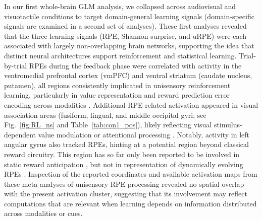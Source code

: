 \documentclass{article}
\begin{document}
In our first whole-brain GLM analysis, we collapsed across audiovisual and visuotactile conditions to target domain-general learning signals (domain-specific signals are examined in a second set of analyses). These first analyses revealed that the three learning signals (RPE, Shannon surprise, and uRPE) were each associated with largely non-overlapping brain networks, supporting the idea that distinct neural architectures support reinforcement and statistical learning. Trial-by-trial RPEs during the feedback phase were correlated with activity in the ventromedial prefrontal cortex (vmPFC) and ventral striatum (caudate nucleus, putamen), all regions consistently implicated in unisensory reinforcement learning, particularly in value representation and reward prediction error encoding across modalities \cite{Schultz1997, glimcher2011understanding, o2004reward, niv2009reinforcement, daw2011trial, o2003temporal}. Additional RPE-related activation appeared in visual association areas (fusiform, lingual, and middle occipital gyri; see Fig.~\ref{fig:RL_ns} and Table~\ref{tab:con1_pos}), likely reflecting visual stimulus-dependent value modulation or attentional processing \cite{chase2015reinforcement, corlett2022meta, garrison2013prediction}. Notably, activity in left angular gyrus also tracked RPEs, hinting at a potential region beyond classical reward circuitry. This region has so far only been reported to be involved in static reward anticipation \cite{wilson2018neural, kahnt2014disentangling}, but not in representation of dynamically evolving RPEs \cite{corlett2022meta, chase2015reinforcement, garrison2013prediction}. Inspection of the reported coordinates and available activation maps from these meta-analyses of unisensory RPE processing revealed no spatial overlap with the present activation cluster, suggesting that its involvement may reflect computations that are relevant when learning depends on information distributed across modalities or cues.\newline
\end{document}
